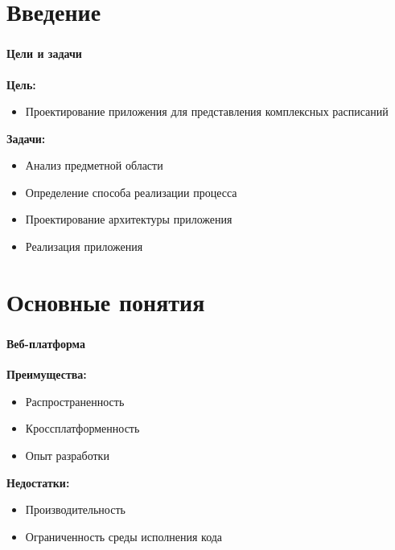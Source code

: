
\frame[plain]{\titlepage}


\section{Введение}

\begin{frame}
\frametitle{\insertsection}
\framesubtitle{Цели и задачи}

\textbf{Цель:}
\begin{itemize}
    \item Проектирование приложения для представления комплексных расписаний
\end{itemize}

\textbf{Задачи:}
\begin{itemize}
    \item Анализ предметной области
    \item Определение способа реализации процесса
    \item Проектирование архитектуры приложения
    \item Реализация приложения
\end{itemize}

\end{frame}


\section{Основные понятия}

\begin{frame}
\frametitle{\insertsection}
\framesubtitle{Веб-платформа}

\textbf{Преимущества:}
\begin{itemize}
    \item Распространенность
    \item Кроссплатформенность
    \item Опыт разработки
\end{itemize}

\textbf{Недостатки:}
\begin{itemize}
    \item Производительность
    \item Ограниченность среды исполнения кода
\end{itemize}

\end{frame}

